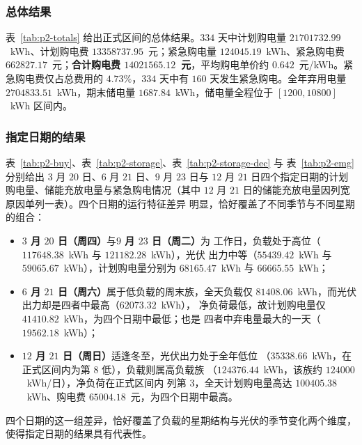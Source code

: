 \documentclass[withoutpreface,bwprint]{cumcmthesis}
\begin{document}
\subsubsection{总体结果}

表~\ref{tab:p2-totals} 给出正式区间的总体结果。$334$ 天中计划购电量
$21701732.99$~kWh、计划购电费 $13358737.95$~元；紧急购电量
$124045.19$~kWh、紧急购电费 $662827.17$~元；\textbf{合计购电费
$14021565.12$~元}，平均购电单价约 $0.642$~元/kWh。紧急购电费仅占总费用的
$4.73\%$，$334$ 天中有 $160$ 天发生紧急购电。全年弃用电量
$2704833.51$~kWh，期末储电量 $1687.84$~kWh，储电量全程位于
$[1200,10800]$~kWh 区间内。



\subsubsection{指定日期的结果}

表~\ref{tab:p2-buy}、表~\ref{tab:p2-storage}、表~\ref{tab:p2-storage-dec} 与
表~\ref{tab:p2-emg} 分别给出 $3$ 月 $20$ 日、$6$ 月 $21$ 日、$9$ 月 $23$ 日与
$12$ 月 $21$ 日四个指定日期的计划购电量、储能充放电量与紧急购电情况（其中
$12$ 月 $21$ 日的储能充放电量因列宽原因单列一表）。四个日期的运行特征差异
明显，恰好覆盖了不同季节与不同星期的组合：

\begin{itemize}
  \item \textbf{$3$ 月 $20$ 日（周四）}与\textbf{$9$ 月 $23$ 日（周二）}为
        工作日，负载处于高位（$117648.38$~kWh 与 $121182.28$~kWh），光伏
        出力中等（$55439.42$~kWh 与 $59065.67$~kWh），计划购电量分别为
        $68165.47$~kWh 与 $66665.55$~kWh；
  \item \textbf{$6$ 月 $21$ 日（周六）}属于低负载的周末族，全天负载仅
        $81408.06$~kWh，而光伏出力却是四者中最高（$62073.32$~kWh），
        净负荷最低，故计划购电量仅 $41410.82$~kWh，为四个日期中最低；也是
        四者中弃电量最大的一天（$19562.18$~kWh）；
  \item \textbf{$12$ 月 $21$ 日（周日）}适逢冬至，光伏出力处于全年低位
        （$35338.66$~kWh，在正式区间内为第 $8$ 低），负载则属高负载族
        （$124376.44$~kWh，该族约 $124000$~kWh/日），净负荷在正式区间内
        列第 $3$，全天计划购电量高达 $100405.38$~kWh、购电费
        $65004.18$~元，为四个日期中最高。
\end{itemize}

四个日期的这一组差异，恰好覆盖了负载的星期结构与光伏的季节变化两个维度，
使得指定日期的结果具有代表性。
\end{document}
